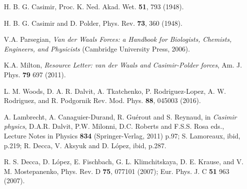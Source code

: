 \documentclass[doublecol]{epl2}
\begin{document}
\begin{thebibliography}{0}

H. B. G. Casimir,
Proc. K. Ned. Akad. Wet. \textbf{51}, 793 (1948).

H. B. G. Casimir and D. Polder, 
Phys. Rev. \textbf{73}, 360 (1948).









V.A. Parsegian, 
\textit{Van der Waals Forces: a Handbook for Biologists, Chemists, Engineers, 
and Physicists} (Cambridge University Press, 2006).

K.A. Milton, 
\textit{Resource Letter: van der Waals and Casimir-Polder forces},
{Am. J. Phys.} \textbf{79} 697 (2011).

L. M. Woods, D. A. R. Dalvit, A. Tkatchenko, P. Rodriguez-Lopez, A. W. Rodriguez, and R. Podgornik
Rev. Mod. Phys. \textbf{88}, 045003 (2016).

A. Lambrecht, A. Canaguier-Durand, R. Gu\'{e}rout and S. Reynaud, in
\textit{Casimir physics}, D.A.R. Dalvit, P.W. Milonni, D.C. Roberts
and F.S.S. Rosa eds., Lecture Notes in Physics \textbf{834}
(Springer-Verlag, 2011) p.97; 
S. Lamoreaux, ibid, p.219;
R. Decca, V. Aksyuk and D. L\'{o}pez, ibid, p.287.




R. S. Decca, D. L{\'o}pez, E. Fischbach, G. L. Klimchitskaya, D. E. Krause,  and  V. M. Mostepanenko, 
Phys. Rev. D \textbf{75}, 077101 (2007); Eur. Phys. J. C \textbf{51} 963 (2007). 


\end{thebibliography}
\end{document}

